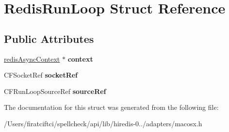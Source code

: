 \hypertarget{struct_redis_run_loop}{}\section{Redis\+Run\+Loop Struct Reference}
\label{struct_redis_run_loop}
\subsection*{Public Attributes}
\begin{DoxyCompactItemize}
\item 
\mbox{\label{struct_redis_run_loop_a082be18e46a6b0bba89f9b6a7c44545d}} 
\mbox{\hyperlink{structredis_async_context}{redis\+Async\+Context}} $\ast$ {\bfseries context}
\item 
\mbox{\label{struct_redis_run_loop_aaec03e51273ef0e0d76778d2078c4674}} 
C\+F\+Socket\+Ref {\bfseries socket\+Ref}
\item 
\mbox{\label{struct_redis_run_loop_a5083e4a92d5ba2821343b9ff170ccc3b}} 
C\+F\+Run\+Loop\+Source\+Ref {\bfseries source\+Ref}
\end{DoxyCompactItemize}


The documentation for this struct was generated from the following file\+:\begin{DoxyCompactItemize}
\item 
/\+Users/firatciftci/spellcheck/api/lib/hiredis-\/0../adapters/macosx.\+h\end{DoxyCompactItemize}

